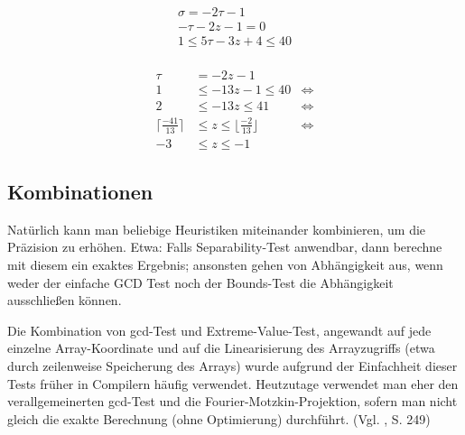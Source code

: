 \begin{align}
\sigma = -2 \tau - 1 \\
- \tau - 2z - 1 = 0 \\
1 \leq 5 \tau - 3 z + 4 \leq 40 \\
\end{align}

\begin{align}
 \tau & = -2z -1  & \\
1      & \leq -13z - 1  \leq 40 & \Leftrightarrow \\
2      & \leq -13z       \leq 41 & \Leftrightarrow \\
\lceil \frac{-41}{13} \rceil & \leq z  \leq \lfloor \frac{-2}{13} \rfloor & \Leftrightarrow \\
-3 & \leq z  \leq -1 &
\end{align}




\subsection{Kombinationen}
Natürlich kann man beliebige Heuristiken miteinander kombinieren, um
die Präzision zu erhöhen. Etwa: Falls Separability-Test anwendbar,
dann berechne mit diesem ein exaktes Ergebnis; ansonsten gehen von
Abhängigkeit aus, wenn weder der einfache GCD Test noch der
Bounds-Test die Abhängigkeit ausschließen können.

Die Kombination von gcd-Test und Extreme-Value-Test, angewandt auf jede
einzelne Array-Koordinate und auf die Linearisierung des Arrayzugriffs
(etwa durch zeilenweise Speicherung des Arrays) wurde aufgrund der
Einfachheit dieser Tests früher in Compilern häufig
verwendet. Heutzutage verwendet man eher den verallgemeinerten gcd-Test
und die Fourier-Motzkin-Projektion, sofern man nicht gleich die exakte
Berechnung (ohne Optimierung) durchführt. (Vgl. \cite{Wol95}, S. 249)
